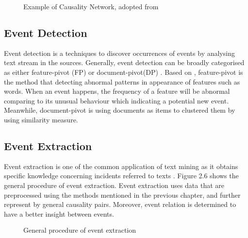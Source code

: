 \documentclass[twoside]{utmthesis}
\begin{document}
\begin{enumerate}
	\begin{figure}[H]
		\centering
		\caption{Example of Causality Network, adopted from \cite{zhao2017constructing}}
	\end{figure} 
	\vspace{-1cm}
\end{enumerate}

\subsection{Event Detection}
Event detection is a techniques to discover occurrences of events by analysing text stream in the sources. Generally, event detection can be broadly categorised as either feature-pivot (FP) or document-pivot(DP) \citep{fedoryszak2019real}. Based on \cite{chen2019bibliometric}, feature-pivot is the method that detecting abnormal patterns in appearance of features such as words. When an event happens, the frequency of a feature will be abnormal comparing to its unusual behaviour which indicating a potential new event. Meanwhile, document-pivot is using documents as items to clustered them by using similarity measure. 




\subsection{Event Extraction}
Event extraction is one of the common application of text mining as it obtains specific knowledge concerning incidents referred to texts \citep{hogenboom2011overview}.  Figure 2.6 shows the general procedure of event extraction. Event extraction uses data that are preprocessed using the methods mentioned in the previous chapter, and further represent by general causality pairs. Moreover, event relation is determined to have a better insight between events.  

\begin{figure}[H]
	\centering
	\caption{General procedure of event extraction}
	\label{fig:eventrepresentation}
\end{figure}
\vspace{-1.5cm}
\end{document}
